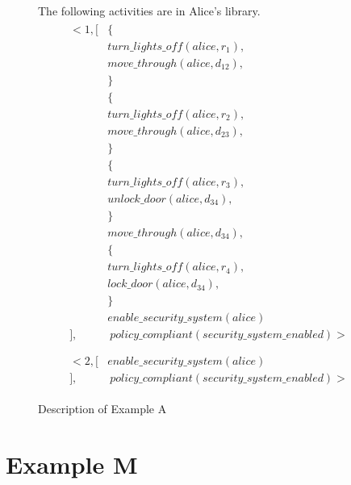 \begin{figure}[H]
\begin{framed}
        The following activities are in Alice's library.
        \begin{gather}
        \begin{split}
            <1, [
                & \{ \\
                    & turn\_lights\_off(alice, r_1), \\
                    & move\_through(alice, d_{12}), \\
                & \} \\
                & \{ \\
                    & turn\_lights\_off(alice, r_{2}), \\
                    & move\_through(alice, d_{23}), \\
                & \} \\
                & \{ \\
                    & turn\_lights\_off(alice, r_{3}), \\
                    & unlock\_door(alice, d_{34}), \\
                & \} \\
                & move\_through(alice, d_{34}), \\
                & \{ \\
                    & turn\_lights\_off(alice, r_{4}), \\
                    & lock\_door(alice, d_{34}), \\
                & \} \\
                & enable\_security\_system(alice) \\
            ], & \ policy\_compliant(security\_system\_enabled)> \\
        \end{split} \\
        \begin{split}
            <2, [
                & enable\_security\_system(alice) \\
            ], & \ policy\_compliant(security\_system\_enabled)>
        \end{split}
        \end{gather}
    \end{framed}
    \caption{Description of Example A}
    \label{fig:apia_example_a_description}
\end{figure}

\section{Example M}

